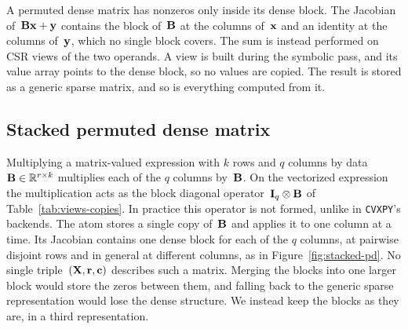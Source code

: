 A permuted dense matrix has nonzeros only inside its dense block. The Jacobian
of~$\mathbf{B}\mathbf{x} + \mathbf{y}$ contains the block of~$\mathbf{B}$ at the columns of~$\mathbf{x}$
and an identity at the columns of~$\mathbf{y}$, which no single block covers. The sum is
instead performed on CSR views of the two operands. A view is built during the symbolic
pass, and its value array points to the dense block, so no values are copied. The result is
stored as a generic sparse matrix, and so is everything computed from it.

\subsection{Stacked permuted dense matrix}\label{sec:theme1-stacked-pd}

Multiplying a matrix-valued expression with $k$ rows and $q$ columns by
data~$\mathbf{B} \in \mathbb{R}^{r \times k}$ multiplies each of the $q$ columns by~$\mathbf{B}$. On
the vectorized expression the multiplication acts as the block diagonal
operator~$\mathbf{I}_q \otimes \mathbf{B}$ of Table~\ref{tab:views-copies}. In practice this
operator is not formed, unlike in \texttt{CVXPY}'s backends. The atom stores a single copy
of~$\mathbf{B}$ and applies it to one column at a time. Its Jacobian contains
one dense block for each of the $q$ columns, at pairwise disjoint rows and in general at
different columns, as in Figure~\ref{fig:stacked-pd}. No single
triple~$(\mathbf{X}, \mathbf{r}, \mathbf{c})$ describes such a matrix. Merging the blocks into one
larger block would store the zeros between them, and falling back to the generic sparse
representation would lose the dense structure. We instead keep the blocks as they are, in a
third representation.

